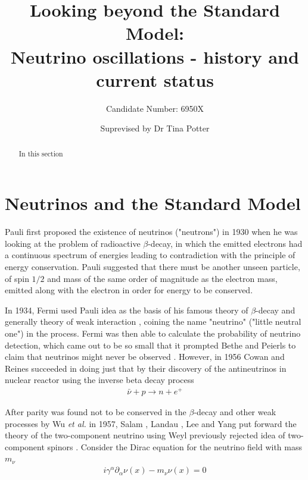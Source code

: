 \documentclass[english]{article}
\begin{document}
\title{Looking beyond the Standard Model: \\Neutrino oscillations - history and current status}
\author{Candidate Number: 6950X}
\date{Suprevised by Dr Tina Potter}
\maketitle

\thispagestyle{fancy}

\begin{abstract}
In this section
\end{abstract}

\section{Neutrinos and the Standard Model}
	Pauli first proposed the existence of neutrinos ("neutrons") in 1930 \cite{pauliletter1930} when he was looking at the problem of radioactive $\beta$-decay, in which the emitted electrons had a continuous spectrum of energies leading to contradiction with the principle of energy conservation. Pauli suggested that there must be another unseen particle, of spin $1/2$ and mass of the same order of magnitude as the electron mass, emitted along with the electron in order for energy to be conserved.
    
    In 1934, Fermi used Pauli idea as the basis of his famous theory of $\beta$-decay and generally theory of weak interaction \cite{fermi1934}, coining the name "neutrino" ("little neutral one") in the process. Fermi was then able to calculate the probability of neutrino detection, which came out to be so small that it prompted Bethe and Peierls to claim that neutrinos might never be observed \cite{bethepeierls1934}. However, in 1956 Cowan and Reines succeeded in doing just that \cite{cowanreines1956} by their discovery of the antineutrinos in nuclear reactor using the inverse beta decay process
    \begin{gather}
    	\bar{\nu}+p \rightarrow n+e^{+}
    \end{gather}
    
    After parity was found not to be conserved in the $\beta$-decay and other weak processes \cite{wu1957} by Wu \textit{et al.} in 1957, Salam \cite{salam1956}, Landau \cite{landau1957}, Lee and Yang \cite{leeyang1957} put forward the theory of the two-component neutrino using Weyl previously rejected idea of two-component spinors \cite{weyl1929}. Consider the Dirac equation for the neutrino field with mass $m_{\nu}$
    \begin{gather}
    	i\gamma^{\alpha} \partial_{\alpha} \nu (x) - m_{\nu} \nu (x) = 0
    \end{gather}
    
\end{document}
